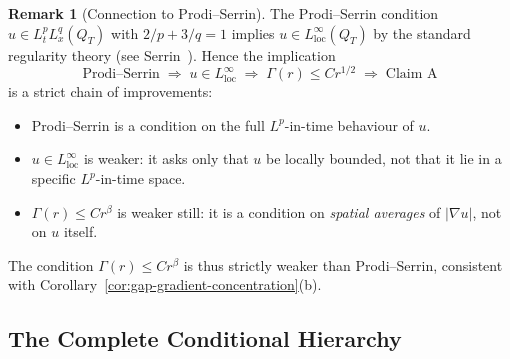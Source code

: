 \documentclass[11pt]{article}
\theoremstyle{definition}
\newtheorem{remark}[theorem]{Remark}
\theoremstyle{remark}
\newcommand{\grad}{\nabla}
\begin{document}
\begin{remark}[Connection to Prodi--Serrin]
\label{rem:PS-connection}
The Prodi--Serrin condition $u \in L^p_t L^q_x(Q_T)$ with
$2/p + 3/q = 1$ implies $u \in L^\infty_{\mathrm{loc}}(Q_T)$ by the
standard regularity theory (see Serrin~\cite{Serrin1962}).
Hence the implication
\[
  \text{Prodi--Serrin} \;\Longrightarrow\; u\in L^\infty_{\mathrm{loc}}
  \;\Longrightarrow\; \Gamma(r)\leq C r^{1/2}
  \;\Longrightarrow\; \text{Claim~A}
\]
is a strict chain of improvements:
\begin{itemize}
  \item Prodi--Serrin is a condition on the full $L^p$-in-time behaviour of $u$.
  \item $u \in L^\infty_{\mathrm{loc}}$ is weaker: it asks only that $u$ be
    locally bounded, not that it lie in a specific $L^p$-in-time space.
  \item $\Gamma(r) \leq Cr^\beta$ is weaker still: it is a condition on
    \emph{spatial averages} of $|\grad u|$, not on $u$ itself.
\end{itemize}
The condition $\Gamma(r) \leq Cr^\beta$ is thus strictly weaker than
Prodi--Serrin, consistent with Corollary~\ref{cor:gap-gradient-concentration}(b).
\end{remark}

\subsection{The Complete Conditional Hierarchy}
\label{subsec:ckn-hierarchy}
\end{document}
